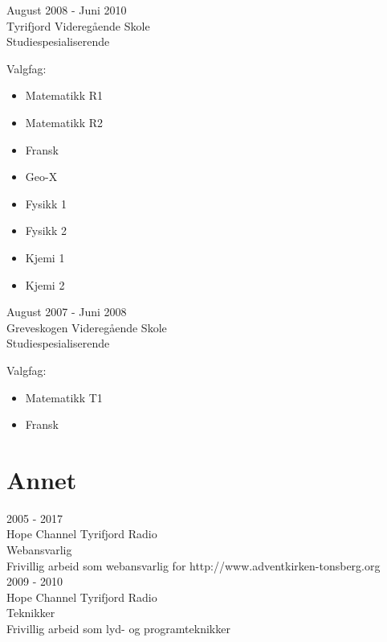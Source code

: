 \documentclass[10pt, a4paper]{article}
\newcommand{\interval}[2]{\small{#1 - #2}}
\newcommand{\institution}[1]{\normalsize{#1}}
\newcommand{\position}[1]{\large{#1}}
\newcommand{\course}[2]{\position{\textsc{#1} #2}}
\newcommand{\desc}[1]{\normalsize{#1}}
\begin{document}
\interval{August 2008}{Juni 2010}\\
\institution{Tyrifjord Videregående Skole}\\
\course{}{Studiespesialiserende}\\
\desc{
  Valgfag: 
  \begin{itemize}
  \itemsep0.5pt
  \item Matematikk R1
  \item Matematikk R2
  \item Fransk
  \item Geo-X
  \item Fysikk 1
  \item Fysikk 2
  \item Kjemi 1
  \item Kjemi 2
  \end{itemize}
}

\interval{August 2007}{Juni 2008}\\
\institution{Greveskogen Videregående Skole}\\
\course{}{Studiespesialiserende}\\
\desc{
  Valgfag: 
  \begin{itemize}
  \itemsep0.5pt
  \item Matematikk T1
  \item Fransk
  \end{itemize}
}

\section*{Annet}

\interval{2005}{2017}\\
\institution{Hope Channel Tyrifjord Radio}\\
\course{}{Webansvarlig}\\
\desc{Frivillig arbeid som webansvarlig for http://www.adventkirken-tonsberg.org}\\

\interval{2009}{2010}\\
\institution{Hope Channel Tyrifjord Radio}\\
\course{}{Teknikker}\\
\desc{Frivillig arbeid som lyd- og programteknikker}
\end{document}
